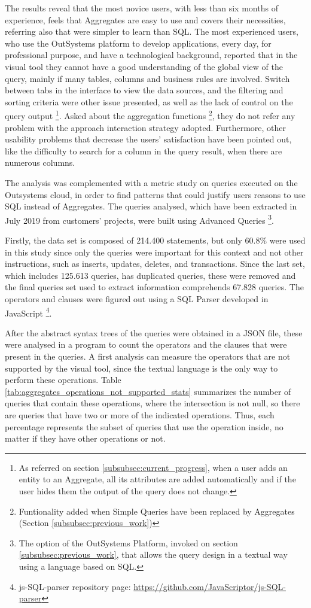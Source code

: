 The results reveal that the most novice users, with less than six months of experience, feels that Aggregates are easy to use and covers their necessities, referring also that were simpler to learn than SQL. The most experienced users, who use the OutSystems platform to develop applications, every day, for professional purpose, and have a technological background, reported that in the visual tool they cannot have a good understanding of the global view of the query, mainly if many tables, columns and business rules are involved. Switch between tabs in the interface to view the data sources, and the filtering and sorting criteria were other issue presented, as well as the lack of control on the query output \footnote{As referred on section \ref{subsubsec:current_progress}, when a user adds an entity to an Aggregate, all its attributes are added automatically and if the user hides them the output of the query does not change.}. Asked about the aggregation functions \footnote{Funtionality added when Simple Queries have been replaced by Aggregates (Section \ref{subsubsec:previous_work})}, they do not refer any problem with the approach interaction strategy adopted. Furthermore, other usability problems that decrease the users’ satisfaction have been pointed out, like the difficulty to search for a column in the query result, when there are numerous columns.

The analysis was complemented with a metric study on queries executed on the Outsystems cloud, in order to find patterns that could justify users reasons to use SQL instead of Aggregates. The queries analysed, which have been extracted in July 2019 from customers’ projects, were built using Advanced Queries \footnote{The option of the OutSystems Platform, invoked on section \ref{subsubsec:previous_work}, that allows the query design in a textual way using a language based on SQL.}.

Firstly, the data set is composed of 214.400 statements, but only 60.8\% were used in this study since only the queries were important for this context and not other instructions, such as inserts, updates, deletes, and transactions. Since the last set, which includes 125.613 queries, has duplicated queries, these were removed and the final queries set used to extract information comprehends 67.828 queries. The operators and clauses were figured out using a SQL Parser developed in JavaScript \footnote{js-SQL-parser repository page: \url{https://github.com/JavaScriptor/js-SQL-parser}}.

After the abstract syntax trees of the queries were obtained in a JSON file, these were analysed in a program to count the operators and the clauses that were present in the queries. A first analysis can measure the operators that are not supported by the visual tool, since the textual language is the only way to perform these operations. Table \ref{tab:aggregates_operations_not_supported_stats} summarizes the number of queries that contain these operations, where the intersection is not null, so there are queries that have two or more of the indicated operations. Thus, each percentage represents the subset of queries that use the operation inside, no matter if they have other operations or not.

